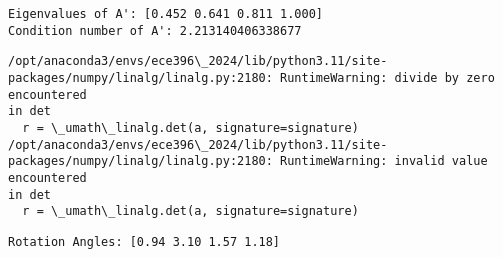 \documentclass[11pt]{article}
\newcommand{\prompt}[4]{
        {\ttfamily\llap{{\color{#2}[#3]:\hspace{3pt}#4}}\vspace{-\baselineskip}}
    }
\begin{document}
    \begin{Verbatim}[commandchars=\\\{\}]
Eigenvalues of A': [0.452 0.641 0.811 1.000]
Condition number of A': 2.213140406338677
    \end{Verbatim}

    \begin{Verbatim}[commandchars=\\\{\}]
/opt/anaconda3/envs/ece396\_2024/lib/python3.11/site-
packages/numpy/linalg/linalg.py:2180: RuntimeWarning: divide by zero encountered
in det
  r = \_umath\_linalg.det(a, signature=signature)
/opt/anaconda3/envs/ece396\_2024/lib/python3.11/site-
packages/numpy/linalg/linalg.py:2180: RuntimeWarning: invalid value encountered
in det
  r = \_umath\_linalg.det(a, signature=signature)
    \end{Verbatim}

    \begin{Verbatim}[commandchars=\\\{\}]
Rotation Angles: [0.94 3.10 1.57 1.18]
    \end{Verbatim}
 
            
\prompt{Out}{outcolor}{8}{}
    
    \begin{center}
    \end{center}
    { \hspace*{\fill} \\}
    
\end{document}
